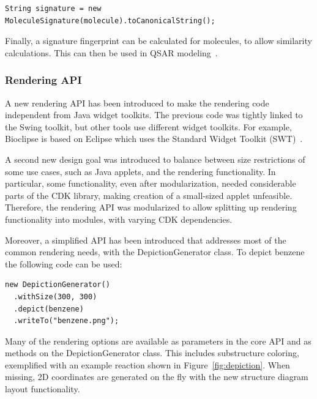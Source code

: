 \documentclass[10pt]{bmcart}
\begin{document}
\vspace{0.2cm}
\begin{verbatim}
String signature = new MoleculeSignature(molecule).toCanonicalString();
\end{verbatim}
\vspace{0.2cm}

  Finally, a signature fingerprint can be calculated for molecules, to allow
  similarity calculations. This can then be used in QSAR modeling~\cite{Alvarsson2016,
  signaturefingerprints,Spjuth2011DS,Moghadam2015,Alvarsson2014,Spjuth2012OS,Norinder2013}.

  \subsubsection*{Rendering API}

  A new rendering API has been introduced to make the rendering code independent
  from Java widget toolkits. The previous code was tightly linked to the Swing
  toolkit, but other tools use different widget toolkits. For example, Bioclipse
  is based on Eclipse which uses the Standard Widget Toolkit (SWT)~\cite{spjuth2007bioclipse}.
  
  A second new design goal was introduced to balance between size restrictions
  of some use cases, such as Java applets, and the rendering functionality. In
  particular, some functionality, even after modularization, needed considerable
  parts of the CDK library, making creation of a small-sized applet unfeasible.
  Therefore, the rendering API was modularized to allow splitting up rendering
  functionality into modules, with varying CDK dependencies.
  
  
  Moreover, a simplified API has been introduced that addresses most of the
  common rendering needs, with the DepictionGenerator class. To depict benzene
  the following code can be used:

\vspace{0.2cm}
\begin{verbatim}
new DepictionGenerator()
  .withSize(300, 300)
  .depict(benzene)
  .writeTo("benzene.png");
\end{verbatim}
\vspace{0.2cm}

  Many of the rendering options are available as parameters in the
  core API and as methods on the DepictionGenerator class. This
  includes substructure coloring, exemplified with an example reaction
  shown in Figure~\ref{fig:depiction}.
  When missing, 2D coordinates are generated on the fly with the new structure
  diagram layout functionality.
\end{document}
